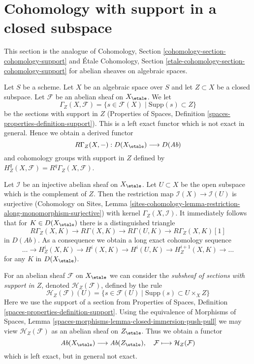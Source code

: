 \section{Cohomology with support in a closed subspace}
\label{section-cohomology-support}

\noindent
This section is the analogue of Cohomology, Section
\ref{cohomology-section-cohomology-support}
and \'Etale Cohomology, Section
\ref{etale-cohomology-section-cohomology-support}
for abelian sheaves on algebraic spaces.

\medskip\noindent
Let $S$ be a scheme.
Let $X$ be an algebraic space over $S$ and let $Z \subset X$ be a closed
subspace. Let $\mathcal{F}$ be an abelian sheaf on $X_\etale$. We let
$$
\Gamma_Z(X, \mathcal{F}) =
\{s \in \mathcal{F}(X) \mid \text{Supp}(s) \subset Z\}
$$
be the sections with support in $Z$
(Properties of Spaces, Definition \ref{spaces-properties-definition-support}).
This is a left exact functor which is not exact in general.
Hence we obtain a derived functor
$$
R\Gamma_Z(X, -) : D(X_\etale) \longrightarrow D(\textit{Ab})
$$
and cohomology groups with support in $Z$ defined by
$H^q_Z(X, \mathcal{F}) = R^q\Gamma_Z(X, \mathcal{F})$.

\medskip\noindent
Let $\mathcal{I}$ be an injective abelian sheaf on $X_\etale$. Let
$U \subset X$ be the open subspace which is the complement of $Z$.
Then the restriction map $\mathcal{I}(X) \to \mathcal{I}(U)$ is surjective
(Cohomology on Sites, Lemma
\ref{sites-cohomology-lemma-restriction-along-monomorphism-surjective})
with kernel $\Gamma_Z(X, \mathcal{I})$. It immediately follows that
for $K \in D(X_\etale)$ there is a distinguished triangle
$$
R\Gamma_Z(X, K) \to R\Gamma(X, K) \to R\Gamma(U, K) \to R\Gamma_Z(X, K)[1]
$$
in $D(\textit{Ab})$. As a consequence we obtain a long exact cohomology
sequence
$$
\ldots \to H^i_Z(X, K) \to H^i(X, K) \to H^i(U, K) \to
H^{i + 1}_Z(X, K) \to \ldots
$$
for any $K$ in $D(X_\etale)$.

\medskip\noindent
For an abelian sheaf $\mathcal{F}$ on $X_\etale$ we can consider
the {\it subsheaf of sections with support in $Z$}, denoted
$\mathcal{H}_Z(\mathcal{F})$, defined by the rule
$$
\mathcal{H}_Z(\mathcal{F})(U) =
\{s \in \mathcal{F}(U) \mid \text{Supp}(s) \subset U \times_X Z\}
$$
Here we use the support of a section from
Properties of Spaces, Definition \ref{spaces-properties-definition-support}.
Using the equivalence of Morphisms of Spaces, Lemma
\ref{spaces-morphisms-lemma-closed-immersion-push-pull}
we may view $\mathcal{H}_Z(\mathcal{F})$ as an abelian sheaf on
$Z_\etale$. Thus we obtain a functor
$$
\textit{Ab}(X_\etale) \longrightarrow \textit{Ab}(Z_\etale),\quad
\mathcal{F} \longmapsto \mathcal{H}_Z(\mathcal{F})
$$
which is left exact, but in general not exact.


